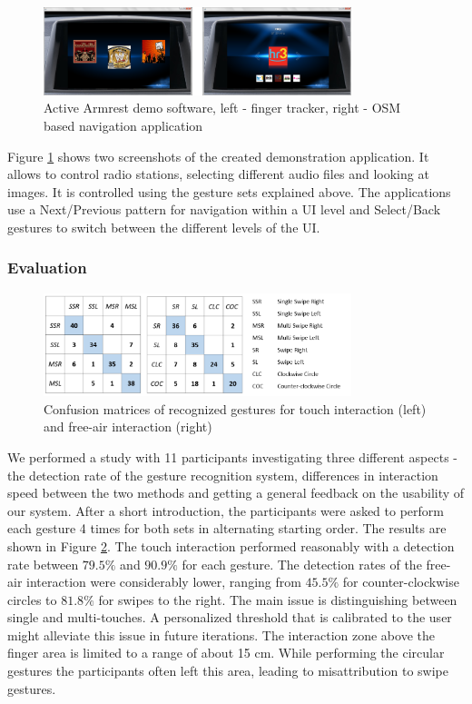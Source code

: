 \begin{figure}[ht]
\centering
\includegraphics[width=0.8\textwidth]{images/armrest_demo_app}
\caption{Active Armrest demo software, left - finger tracker, right - OSM based navigation application \cite{braun2013ActiveArmrest}}
\label{fig:armrest_demo_app}
\end{figure}

Figure \ref{fig:armrest_demo_app} shows two screenshots of the created demonstration application. It allows to control radio stations, selecting different audio files and looking at images. It is controlled using the gesture sets explained above. The applications use a Next/Previous pattern for navigation within a UI level and Select/Back gestures to switch between the different levels of the UI.

\subsubsection{Evaluation}
\begin{figure}[ht]
\centering
\includegraphics[width=0.8\textwidth]{images/armrest_eval_confustion}
\caption{Confusion matrices of recognized gestures for touch interaction (left) and free-air interaction (right)}
\label{fig:armrest_eval_confustion}
\end{figure}

We performed a study with 11 participants investigating three different aspects - the detection rate of the gesture recognition system, differences in interaction speed between the two methods and getting a general feedback on the usability of our system. After a short introduction, the participants were asked to perform each gesture 4 times for both sets in alternating starting order. The results are shown in Figure \ref{fig:armrest_eval_confustion}. The touch interaction performed reasonably with a detection rate between $79.5\%$ and $90.9\%$ for each gesture. The detection rates of the free-air interaction were considerably lower, ranging from $45.5\%$ for counter-clockwise circles to $81.8\%$ for swipes to the right. The main issue is distinguishing between single and multi-touches. A personalized threshold that is calibrated to the user might alleviate this issue in future iterations. The interaction zone above the finger area is limited to a range of about 15 cm. While performing the circular gestures the participants often left this area, leading to misattribution to swipe gestures.

